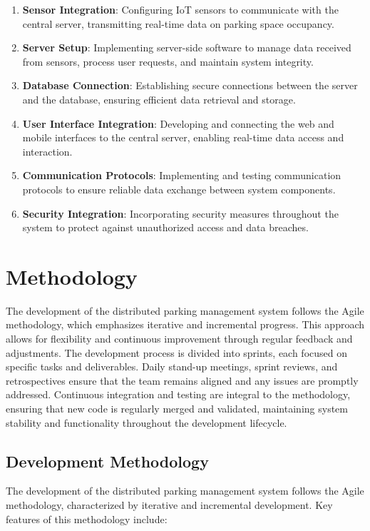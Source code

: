 \documentclass[oneside, 12pt, a4paper]{book}
\begin{document}
\begin{enumerate}
  \item \textbf{\textbf{Sensor Integration}}: Configuring IoT sensors to communicate with the central server, transmitting real-time data on parking space occupancy.
  \item \textbf{\textbf{Server Setup}}: Implementing server-side software to manage data received from sensors, process user requests, and maintain system integrity.
  \item \textbf{\textbf{Database Connection}}: Establishing secure connections between the server and the database, ensuring efficient data retrieval and storage.
  \item \textbf{\textbf{User Interface Integration}}: Developing and connecting the web and mobile interfaces to the central server, enabling real-time data access and interaction.
  \item \textbf{\textbf{Communication Protocols}}: Implementing and testing communication protocols to ensure reliable data exchange between system components.
  \item \textbf{\textbf{Security Integration}}: Incorporating security measures throughout the system to protect against unauthorized access and data breaches.
\end{enumerate}
\chapter{Methodology}
The development of the distributed parking management system follows the Agile methodology, which emphasizes iterative and incremental progress. This approach allows for flexibility and continuous improvement through regular feedback and adjustments. The development process is divided into sprints, each focused on specific tasks and deliverables. Daily stand-up meetings, sprint reviews, and retrospectives ensure that the team remains aligned and any issues are promptly addressed. Continuous integration and testing are integral to the methodology, ensuring that new code is regularly merged and validated, maintaining system stability and functionality throughout the development lifecycle.
\section{Development Methodology}
The development of the distributed parking management system follows the Agile methodology, characterized by iterative and incremental development. Key features of this methodology include:
\end{document}
